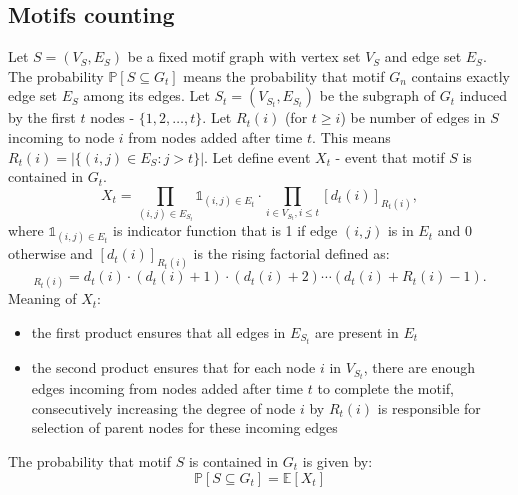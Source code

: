 \documentclass{article}
\begin{document}
\subsection*{Motifs counting}
Let $S = (V_S, E_S)$ be a fixed motif graph with vertex set $V_S$ and edge set $E_S$. The probability $\mathds{P}[S \subseteq G_t]$ means the probability that motif $G_n$ contains exactly edge set $E_S$ among its edges.
\newline
\newline
Let $S_t = (V_{S_t}, E_{S_t})$ be the subgraph of $G_t$ induced by the first $t$ nodes - $\{1, 2, \ldots, t\}$.
\newline
\newline
Let $R_t(i)$ (for $t \geq i$) be number of edges in $S$ incoming to node $i$ from nodes added after time $t$. 
\newline
This means $R_t(i) = |\{(i,j) \in E_S : j > t\}|$.
\newline
\newline
Let define event $X_t$ - event that motif $S$ is contained in $G_t$.
\begin{equation}
    X_t = \prod_{(i,j) \in E_{S_t}} \mathds{1}_{(i,j) \in E_t} \cdot \prod_{i \in V_{S_t}, i \leq t} [d_t(i)]_{R_t(i)},
\end{equation}
where $\mathds{1}_{(i,j) \in E_t}$ is indicator function that is 1 if edge $(i,j)$ is in $E_t$ and 0 otherwise and $[d_t(i)]_{R_t(i)}$ is the rising factorial defined as:
\begin{equation}
    [d_t(i)]_{R_t(i)} = d_t(i) \cdot (d_t(i) + 1) \cdot (d_t(i) + 2) \cdots (d_t(i) + R_t(i) - 1). 
\end{equation}
\newline
Meaning of $X_t$:
\begin{itemize}
    \item the first product ensures that all edges in $E_{S_t}$ are present in $E_t$
    \item the second product ensures that for each node $i$ in $V_{S_t}$, there are enough edges incoming from nodes added after time $t$ to complete the motif, consecutively increasing the degree of node $i$ by $R_t(i)$ is responsible for selection of parent nodes for these incoming edges
\end{itemize}
The probability that motif $S$ is contained in $G_t$ is given by:
\begin{equation}
    \mathds{P}[S \subseteq G_t] = \mathds{E}[X_t]
\end{equation}
\end{document}
